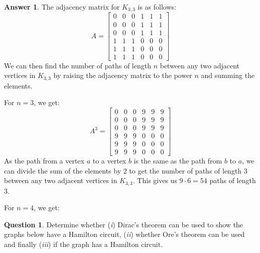 \documentclass[article, 12pt]{article}
\theoremstyle{definition}
\newtheorem{question}{Question}
\newtheorem{answer}{Answer}
\begin{document}
    \begin{answer}
        The adjacency matrix for $K_{3,3}$ is as follows:
        \begin{equation*}
            A = \begin{bmatrix}
                0 & 0 & 0 & 1 & 1 & 1 \\
                0 & 0 & 0 & 1 & 1 & 1 \\
                0 & 0 & 0 & 1 & 1 & 1 \\
                1 & 1 & 1 & 0 & 0 & 0 \\
                1 & 1 & 1 & 0 & 0 & 0 \\
                1 & 1 & 1 & 0 & 0 & 0
            \end{bmatrix}
        \end{equation*}
        We can then find the number of paths of length $n$ between any two adjacent vertices in $K_{3,3}$ by raising the adjacency matrix to the power $n$ and summing the elements. 
        
        For $n = 3$, we get:
        \begin{equation*}
            A^3 = \begin{bmatrix}
                0 & 0 & 0 & 9 & 9 & 9 \\
                0 & 0 & 0 & 9 & 9 & 9 \\
                0 & 0 & 0 & 9 & 9 & 9 \\
                9 & 9 & 9 & 0 & 0 & 0 \\
                9 & 9 & 9 & 0 & 0 & 0 \\
                9 & 9 & 9 & 0 & 0 & 0
            \end{bmatrix}
        \end{equation*}
        As the path from a vertex $a$ to a vertex $b$ is the same as the path from $b$ to $a$, we can divide the sum of the elements by 2 to get the number of paths of length 3 between any two adjacent vertices in $K_{3,3}$. This gives us $9 \cdot 6 = 54$ paths of length 3. 
        
        For $n = 4$, we get:
    \end{answer}
    \begin{question}
        Determine whether  ({\em i}) Dirac's theorem can be used to show  the graphs below have a Hamilton circuit, ({\em ii}) whether Ore's theorem can be used and finally ({\em iii}) if the graph has a Hamilton circuit.
        \begin{figure}[H]
            \centering
        \end{figure}
    \end{question}
\end{document}
